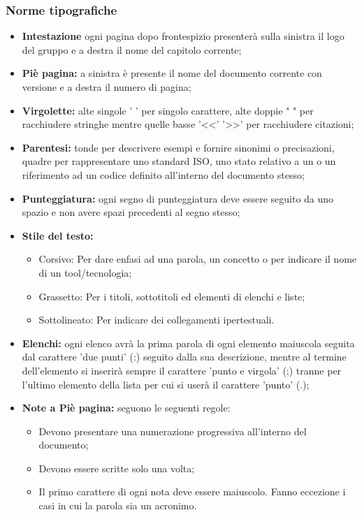 \documentclass[NormeDiProgetto.tex]{subfiles}
\begin{document}
	\subsubsection{Norme tipografiche}
		\begin{itemize}
			\item \textbf{Intestazione} ogni pagina dopo frontespizio presenterà sulla sinistra il logo del gruppo e a destra il nome del capitolo corrente;
			
			\item \textbf{Piè pagina:} a sinistra è presente il nome del documento corrente con versione e a destra il numero di pagina; 
			
			\item \textbf{Virgolette:} alte singole ' ' per singolo carattere, alte doppie " " per racchiudere stringhe mentre quelle basse '\textless \textless ' '\textgreater \textgreater ' per racchiudere citazioni;
			 
			\item \textbf{Parentesi:} tonde per descrivere esempi e fornire sinonimi o precisazioni, quadre per rappresentare uno standard ISO, uno stato relativo a un  o un riferimento ad un codice definito all'interno del documento stesso;
			
			\item \textbf{Punteggiatura:} ogni segno di punteggiatura deve essere seguito da uno spazio e non avere spazi precedenti al segno stesso;

			\item \textbf{Stile del testo:} 
			\begin{itemize}
				\item Corsivo: Per dare enfasi ad una parola, un concetto o per indicare il nome di un tool/tecnologia;
				\item Grassetto: Per i titoli, sottotitoli ed elementi di elenchi e liste;
				\item Sottolineato: Per indicare dei collegamenti ipertestuali.
			\end{itemize}
		
			\item \textbf{Elenchi:} ogni elenco avrà la prima parola di ogni elemento maiuscola seguita dal carattere 'due punti' (:) seguito dalla sua descrizione, mentre al termine dell'elemento si inserirà sempre il carattere 'punto e virgola' (;) tranne per l'ultimo elemento della lista per cui si userà il carattere 'punto' (.);
			 
			\item \textbf{Note a Piè pagina:} seguono le seguenti regole: 
			\begin{itemize}
				\item Devono presentare una numerazione progressiva all'interno del documento;
				\item Devono essere scritte solo una volta;
				\item Il primo carattere di ogni nota deve essere maiuscolo. Fanno eccezione i casi in cui la parola sia un acronimo.
			\end{itemize}
			 

\end{itemize}
\end{document}
